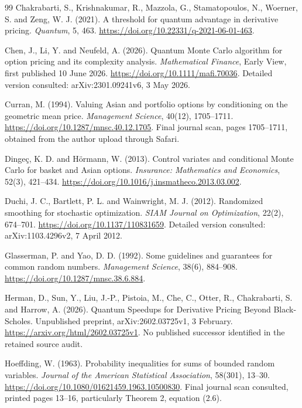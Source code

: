 \documentclass[11pt]{article}
\begin{document}
\begin{thebibliography}{99}
 Chakrabarti, S., Krishnakumar, R., Mazzola, G., Stamatopoulos, N., Woerner, S. and Zeng, W. J. (2021). A threshold for quantum advantage in derivative pricing. \emph{Quantum}, 5, 463. \url{https://doi.org/10.22331/q-2021-06-01-463}.

 Chen, J., Li, Y. and Neufeld, A. (2026). Quantum Monte Carlo algorithm for option pricing and its complexity analysis. \emph{Mathematical Finance}, Early View, first published 10 June 2026. \url{https://doi.org/10.1111/mafi.70036}. Detailed version consulted: arXiv:2301.09241v6, 3 May 2026.

 Curran, M. (1994). Valuing Asian and portfolio options by conditioning on the geometric mean price. \emph{Management Science}, 40(12), 1705--1711. \url{https://doi.org/10.1287/mnsc.40.12.1705}. Final journal scan, pages 1705--1711, obtained from the author upload through Safari.

 Dinge\c{c}, K. D. and H\"ormann, W. (2013). Control variates and conditional Monte Carlo for basket and Asian options. \emph{Insurance: Mathematics and Economics}, 52(3), 421--434. \url{https://doi.org/10.1016/j.insmatheco.2013.03.002}.

Duchi, J. C., Bartlett, P. L. and Wainwright, M. J. (2012). Randomized smoothing for stochastic optimization.
\emph{SIAM Journal on Optimization}, 22(2), 674--701. \url{https://doi.org/10.1137/110831659}.
Detailed version consulted: arXiv:1103.4296v2, 7 April 2012.

Glasserman, P. and Yao, D. D. (1992). Some guidelines and guarantees for common random numbers.
\emph{Management Science}, 38(6), 884--908. \url{https://doi.org/10.1287/mnsc.38.6.884}.

 Herman, D., Sun, Y., Liu, J.-P., Pistoia, M., Che, C., Otter, R., Chakrabarti, S. and Harrow, A. (2026). Quantum Speedups for Derivative Pricing Beyond Black-Scholes. Unpublished preprint, arXiv:2602.03725v1, 3 February. \url{https://arxiv.org/html/2602.03725v1}. No published successor identified in the retained source audit.

 Hoeffding, W. (1963). Probability inequalities for sums of bounded random variables. \emph{Journal of the American Statistical Association}, 58(301), 13--30. \url{https://doi.org/10.1080/01621459.1963.10500830}. Final journal scan consulted, printed pages 13--16, particularly Theorem 2, equation (2.6).


\end{thebibliography}
\end{document}
